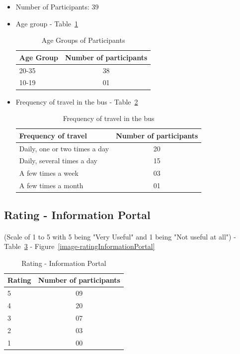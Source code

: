 \begin {itemize}

\item Number of Participants: 39

\item Age group - Table~\ref{table-survey-ageGroupOfSurveyParticipants}

\begin{table} [H]
\centering
\begin{tabular}{|l|c|}
\hline
Age Group & Number of participants \\
\hline
20-35	&38 \\
10-19	&01 \\
\hline
\end{tabular}
\caption{Age Groups of Participants}
\label{table-survey-ageGroupOfSurveyParticipants}
\end{table}

\item Frequency of travel in the bus - Table~\ref{table-survey-frequencyOfTravelInTheBus}

\begin{table} [H]
\centering
\begin{tabular}{|l|c|}
\hline
Frequency of travel & Number of participants \\
\hline
Daily, one or two times a day	&20 \\
Daily, several times a day	&15 \\
A few times a week	&03 \\
A few times a month	&01 \\
\hline
\end{tabular}
\caption{Frequency of travel in the bus}
\label{table-survey-frequencyOfTravelInTheBus}
\end{table}

\end{itemize}

\subsection{Rating - Information Portal} 

\paragraph{} (Scale of 1 to 5 with 5 being "Very Useful" and 1 being "Not useful at all") - Table~\ref{table-survey-rating-InformationPortal} - Figure~\ref{image-ratingInformationPortal}

\begin{table} [H]
\centering
\begin{tabular}{|l|c|}
\hline
Rating & Number of participants \\
\hline
5	&09 \\
4	&20 \\
3	&07 \\
2	&03 \\
1	&00 \\
\hline
\end{tabular}
\caption{Rating - Information Portal}
\label{table-survey-rating-InformationPortal}
\end{table}

